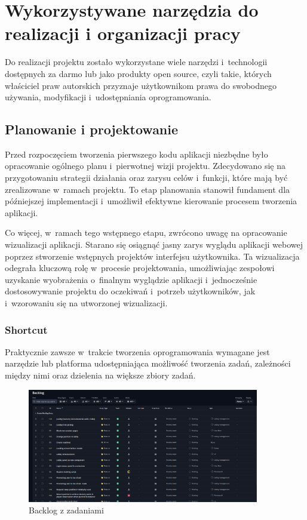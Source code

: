 \section{Wykorzystywane narzędzia do realizacji i organizacji pracy}

Do realizacji projektu zostało wykorzystane wiele narzędzi i~technologii
dostępnych za darmo lub jako produkty open source, czyli takie,
których właściciel praw autorskich przyznaje użytkownikom prawa
do swobodnego używania, modyfikacji i~udostępniania oprogramowania.


\subsection{Planowanie i projektowanie}

Przed rozpoczęciem tworzenia pierwszego kodu aplikacji niezbędne było
opracowanie ogólnego planu i~pierwotnej wizji projektu. Zdecydowano
się na przygotowaniu strategii działania oraz
zarysu celów i~funkcji, które mają być zrealizowane w~ramach projektu.
To etap planowania stanowił fundament dla późniejszej implementacji
i~umożliwił efektywne kierowanie procesem tworzenia aplikacji.

Co więcej, w~ramach tego wstępnego etapu, zwrócono uwagę na
opracowanie wizualizacji aplikacji. Starano się osiągnąć jasny
zarys wyglądu aplikacji webowej poprzez stworzenie wstępnych projektów
interfejsu użytkownika. Ta wizualizacja odegrała kluczową rolę
w~procesie projektowania, umożliwiając zespołowi uzyskanie wyobrażenia
o~finalnym wyglądzie aplikacji i~jednocześnie dostosowywanie projektu
do oczekiwań i~potrzeb użytkowników, jak i~wzorowaniu się na utworzonej
wizualizacji.


\subsubsection{Shortcut}

Praktycznie zawsze w~trakcie tworzenia oprogramowania wymagane jest
narzędzie lub platforma udostępniająca możliwość tworzenia zadań,
zależności między nimi oraz dzielenia na większe zbiory zadań.

\begin{figure}[h!]
    \centering
    \includegraphics[width=0.9\textwidth]{img/shortcut/shortcut_backlog.png}
    \caption{Backlog z zadaniami}
\end{figure}

